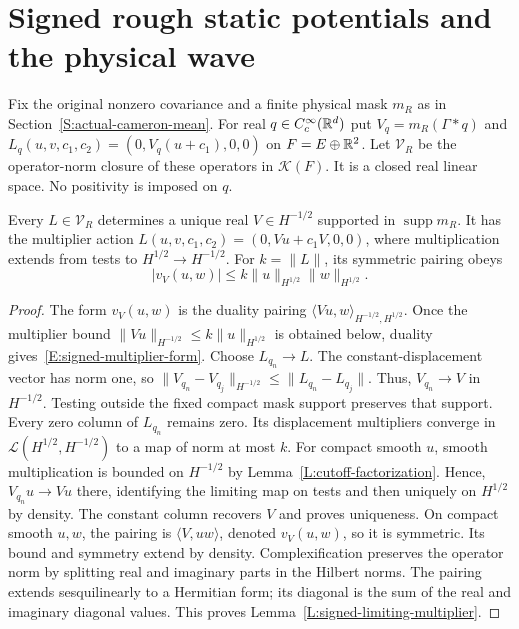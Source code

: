 \section{Signed rough static potentials and the physical wave}
\label{S:signed-static-wave}

Fix the original nonzero covariance and a finite physical mask $m_R$ as in
Section~\ref{S:actual-cameron-mean}. For real $q \in C_c^\infty(\mathbb{R}^d)$ put $V_q
= m_R(\Gamma*q)$ and $L_q(u,v,c_1,c_2) = (0,V_q(u+c_1),0,0)$ on $F =
E\oplus\mathbb{R}^2$. Let $\mathcal{V}_R$ be the operator-norm closure of these
operators in $\mathcal{K}(F)$. It is a closed real linear space. No positivity
is imposed on $q$.

\begin{lemma}\label{L:signed-limiting-multiplier}
  Every $L \in \mathcal{V}_R$ determines a unique real $V \in H^{-1/2}$
  supported in $\operatorname{supp}m_R$. It has the multiplier action
  $L(u,v,c_1,c_2) = (0,Vu+c_1V,0,0)$, where multiplication extends from tests to
  $H^{1/2} \to H^{-1/2}$. For $k = \|L\|$, its symmetric pairing obeys
  \begin{equation}\label{E:signed-multiplier-form}
    |v_V(u,w)|\le k\|u\|_{H^{1/2}}\|w\|_{H^{1/2}} .
  \end{equation}
\end{lemma}

\begin{proof}
  The form $v_V(u,w)$ is the duality pairing
  $\langle Vu,w\rangle_{H^{-1/2},H^{1/2}}$.
  Once the multiplier bound $\|Vu\|_{H^{-1/2}}\le k\|u\|_{H^{1/2}}$
  is obtained below, duality gives~\eqref{E:signed-multiplier-form}.
  Choose $L_{q_n} \to L$. The constant-displacement vector has norm one, so
  $\|V_{q_n}-V_{q_j}\|_{H^{-1/2}} \le \|L_{q_n}-L_{q_j}\|$. Thus, $V_{q_n} \to
  V$ in $H^{-1/2}$. Testing outside the fixed compact mask support preserves
  that support. Every zero column of $L_{q_n}$ remains zero. Its displacement
  multipliers converge in $\mathcal{L}(H^{1/2},H^{-1/2})$ to a map of norm at
  most $k$. For compact smooth $u$, smooth multiplication is bounded on
  $H^{-1/2}$ by Lemma~\ref{L:cutoff-factorization}. Hence, $V_{q_n}u \to Vu$
  there, identifying the limiting map on tests and then uniquely on $H^{1/2}$ by
  density. The constant column recovers $V$ and proves uniqueness. On compact
  smooth $u,w$, the pairing is $\langle V,uw\rangle$, denoted $v_V(u,w)$, so it
  is symmetric. Its bound and symmetry extend by density. Complexification
  preserves the operator norm by splitting real and imaginary parts in the
  Hilbert norms. The pairing extends sesquilinearly to a Hermitian form; its
  diagonal is the sum of the real and imaginary diagonal values. This proves
  Lemma~\ref{L:signed-limiting-multiplier}.
\end{proof}


